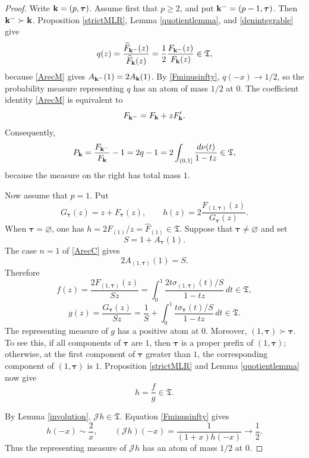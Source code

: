 \documentclass[10pt,a4paper]{amsart}
\begin{document}
\begin{proof}
Write ${\bf k}=(p,{\boldsymbol\tau})$. Assume first that $p\geq 2$, and put ${\bf k}^{-}=(p-1,{\boldsymbol\tau})$.  Then ${\bf k}^{-}\succ{\bf k}$.  Proposition \ref{strictMLR}, Lemma \ref{quotientlemma}, and \eqref{denintegrable} give
\begin{equation}\label{qminus}
q(z)=\frac{\widehat F_{{\bf k}^{-}}(z)}{\widehat F_{\bf k}(z)}
=\frac12\frac{F_{{\bf k}^{-}}(z)}{F_{\bf k}(z)}
\in\mathfrak{T},
\end{equation}
because \eqref{ArecM} gives
$A_{{\bf k}^{-}}(1)=2A_{\bf k}(1)$.  By \eqref{Fminusinfty}, $q(-x)\rightarrow1/2$, so the probability measure representing $q$ has an atom of mass $1/2$ at $0$.  The coefficient identity \eqref{ArecM} is equivalent to
\[
F_{{\bf k}^{-}}=F_{\bf k}+zF_{\bf k}'.
\]
Consequently,
\[
P_{\bf k}=\frac{F_{{\bf k}^{-}}}{F_{\bf k}}-1
=2q-1
=2\int_{(0,1]}\frac{d\nu(t)}{1-tz}\in\mathfrak{T},
\]
because the measure on the right has total mass $1$.

Now assume that $p=1$.  Put
\[
G_{\boldsymbol\tau}(z)=z+F_{\boldsymbol\tau}(z),
\qquad
h(z)=2\frac{F_{(1,{\boldsymbol\tau})}(z)}{G_{\boldsymbol\tau}(z)}.
\]
When ${\boldsymbol\tau}=\varnothing$, one has
$h=2F_{(1)}/z=\widehat F_{(1)}\in\mathfrak{T}$.  Suppose that ${\boldsymbol\tau}\neq\varnothing$ and set
\[
S=1+A_{\boldsymbol\tau}(1).
\]
The case $n=1$ of \eqref{ArecC} gives
\begin{equation}\label{halfcoefficient}
2A_{(1,{\boldsymbol\tau})}(1)=S.
\end{equation}
Therefore
\[
f(z)=\frac{2F_{(1,{\boldsymbol\tau})}(z)}{Sz}
=\int_0^1\frac{2t\sigma_{(1,{\boldsymbol\tau})}(t)/S}{1-tz}\,dt
\in\mathfrak{T},
\]
\[
g(z)=\frac{G_{\boldsymbol\tau}(z)}{Sz}
=\frac1S+\int_0^1\frac{t\sigma_{\boldsymbol\tau}(t)/S}{1-tz}\,dt
\in\mathfrak{T}.
\]
The representing measure of $g$ has a positive atom at $0$.  Moreover,
$(1,{\boldsymbol\tau})\succ{\boldsymbol\tau}$.  To see this, if all components of ${\boldsymbol\tau}$ are $1$, then ${\boldsymbol\tau}$ is a proper prefix of $(1,{\boldsymbol\tau})$; otherwise, at the first component of ${\boldsymbol\tau}$ greater than $1$, the corresponding component of $(1,{\boldsymbol\tau})$ is $1$.  Proposition \ref{strictMLR} and Lemma \ref{quotientlemma} now give
\[
h=\frac fg\in\mathfrak{T}.
\]

By Lemma \ref{involution}, $\mathcal{J}h\in\mathfrak{T}$.  Equation \eqref{Fminusinfty} gives
\[
h(-x)\sim\frac2x,
\qquad
(\mathcal{J}h)(-x)=\frac1{(1+x)h(-x)}\rightarrow\frac12.
\]
Thus the representing measure of $\mathcal{J}h$ has an atom of mass $1/2$ at $0$.


\end{proof}
\end{document}
